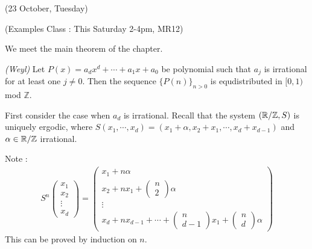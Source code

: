 \documentclass[10pt,a4paper]{report}
\newenvironment{proof}
{\begin{changemargin}{1cm}{0.5cm} 
	}%
	{\end{changemargin}
}
\begin{document}
\newday

(23 October, Tuesday)
\s

(Examples Class : This Saturday 2-4pm, MR12)
\s

We meet the main theorem of the chapter.
\s

\thm \emph{(Weyl)} Let $P(x) = a_d x^d + \cdots + a_1 x + a_0$ be polynomial such that $a_j$ is irrational for at least one $j\neq 0$. Then the sequence $\{ P(n) \}_{n>0}$ is equdistributed in $[0,1)$ mod $\mathbb{Z}$.
\begin{proof}
\pf First consider the case when $a_d$ is irrational. Recall that the system $(\mathbb{R}/\mathbb{Z}, S)$ is uniquely ergodic, where $S(x_1, \cdots, x_d) = (x_1 + \alpha, x_2 +x_1, \cdots, x_d + x_{d-1})$ and $\alpha \in \mathbb{R}/\mathbb{Z}$ irrational.

\quad Note :
\begin{align*}
S^n \begin{pmatrix}
x_1 \\
x_2 \\
\vdots \\
x_d
\end{pmatrix} = \begin{pmatrix}
x_1 + n \alpha \\
x_2 + n x_1 + \begin{pmatrix}
n\\
2
\end{pmatrix} \alpha \\
\vdots \\
x_d + n x_{d-1} +  \cdots + \begin{pmatrix}
n \\
d-1
\end{pmatrix} x_1 + \begin{pmatrix}
n \\
d
\end{pmatrix} \alpha
\end{pmatrix}
\end{align*}
This can be proved by induction on $n$.


\end{proof}
\end{document}

